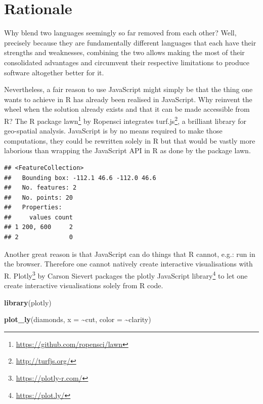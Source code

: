 \documentclass[
]{krantz}
\makeatletter
\newenvironment{Shaded}{\begin{snugshade}}{\end{snugshade}}
\newcommand{\DataTypeTok}[1]{\textcolor[rgb]{0.27,0.27,0.27}{#1}}
\newcommand{\KeywordTok}[1]{\textcolor[rgb]{0.27,0.27,0.27}{\textbf{#1}}}
\newcommand{\NormalTok}[1]{#1}
\newcommand{\OperatorTok}[1]{\textcolor[rgb]{0.43,0.43,0.43}{\textbf{#1}}}
\newcommand{\StringTok}[1]{\textcolor[rgb]{0.5,0.5,0.5}{#1}}
\renewcommand{\href}[2]{#2\footnote{\url{#1}}}
\newenvironment{kframe}{%
\medskip{}
\setlength{\fboxsep}{.8em}
 \def\at@end@of@kframe{}%
 \ifinner\ifhmode%
  \def\at@end@of@kframe{\end{minipage}}%
  \begin{minipage}{\columnwidth}%
 \fi\fi%
 \def\FrameCommand##1{\hskip\@totalleftmargin \hskip-\fboxsep
 \colorbox{shadecolor}{##1}\hskip-\fboxsep
     \hskip-\linewidth \hskip-\@totalleftmargin \hskip\columnwidth}%
 \MakeFramed {\advance\hsize-\width
   \@totalleftmargin\z@ \linewidth\hsize
   \@setminipage}}%
 {\par\unskip\endMakeFramed%
 \at@end@of@kframe}
\renewenvironment{Shaded}{\begin{kframe}}{\end{kframe}}
\makeatother
\begin{document}
\hypertarget{rationale}{%
\section{Rationale}\label{rationale}}

Why blend two languages seemingly so far removed from each other? Well, precisely because they are fundamentally different languages that each have their strengths and weaknesses, combining the two allows making the most of their consolidated advantages and circumvent their respective limitations to produce software altogether better for it.

Nevertheless, a fair reason to use JavaScript might simply be that the thing one wants to achieve in R has already been realised in JavaScript. Why reinvent the wheel when the solution already exists and that it can be made accessible from R? The R package \href{https://github.com/ropensci/lawn}{lawn} \citep{R-lawn} by Ropensci integrates \href{http://turfjs.org/}{turf.js}, a brilliant library for geo-spatial analysis. JavaScript is by no means required to make those computations, they could be rewritten solely in R but that would be vastly more laborious than wrapping the JavaScript API in R as done by the package lawn.

\begin{Shaded}
\end{Shaded}

\begin{verbatim}
## <FeatureCollection>
##   Bounding box: -112.1 46.6 -112.0 46.6
##   No. features: 2
##   No. points: 20
##   Properties: 
##     values count
## 1 200, 600     2
## 2              0
\end{verbatim}

Another great reason is that JavaScript can do things that R cannot, e.g.: run in the browser. Therefore one cannot natively create interactive visualisations with R. \href{https://plotly-r.com/}{Plotly} \citep{R-plotly} by Carson Sievert packages the \href{https://plot.ly/}{plotly JavaScript library} to let one create interactive visualisations solely from R code.

\begin{Shaded}
\begin{Highlighting}[]
\KeywordTok{library}\NormalTok{(plotly)}

\KeywordTok{plot\_ly}\NormalTok{(diamonds, }\DataTypeTok{x =} \OperatorTok{\textasciitilde{}}\NormalTok{cut, }\DataTypeTok{color =} \OperatorTok{\textasciitilde{}}\NormalTok{clarity)}
\end{Highlighting}
\end{Shaded}
\end{document}
